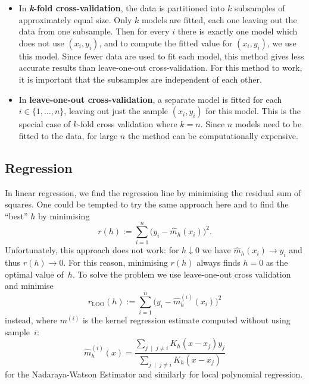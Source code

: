 \documentclass[
  a4paper,
]{article}
\theoremstyle{definition}
\theoremstyle{definition}
\theoremstyle{definition}
\theoremstyle{definition}
\theoremstyle{remark}
\begin{document}
\begin{itemize}
\item
  In \textbf{\emph{k}-fold cross-validation}, the data is partitioned into
  \(k\) subsamples of approximately equal size. Only \(k\) models are fitted,
  each one leaving out the data from one subsample. Then for every \(i\)
  there is exactly one model which does not use \((x_i, y_i)\), and
  to compute the fitted value for \((x_i, y_i)\), we use this model.
  Since fewer data are used to fit each model, this method gives less
  accurate results than leave-one-out cross-validation.
  For this method to work, it is important that the subsamples
  are independent of each other.
\item
  In \textbf{leave-one-out cross-validation}, a separate model is fitted
  for each \(i \in \{1, \ldots, n\}\), leaving out just the sample \((x_i, y_i)\)
  for this model. This is the special case of \(k\)-fold cross validation
  where \(k = n\).
  Since \(n\) models need to be fitted to the data, for large \(n\)
  the method can be computationally expensive.
\end{itemize}

\hypertarget{regression}{%
\subsection{Regression}\label{regression}}

In linear regression, we find the regression line by minimising
the residual sum of squares. One could be tempted to try the same
approach here and to find the ``best'' \(h\) by minimising
\begin{equation*}
  r(h)
  := \sum_{i=1}^n \bigl( y_i - \hat m_h(x_i) \bigr)^2.
\end{equation*}
Unfortunately, this approach does not work: for \(h \downarrow 0\)
we have \(\hat m_h(x_i) \to y_i\) and thus \(r(h) \to 0\). For this reason,
minimising \(r(h)\) always finds \(h=0\) as the optimal value of~\(h\).
To solve the problem we use leave-one-out cross validation and minimise
\begin{equation*}
  r_\mathrm{LOO}(h)
  := \sum_{i=1}^n \bigl( y_i - \hat m^{(i)}_h(x_i) \bigr)^2
\end{equation*}
instead,
where \(m^{(i)}\) is the kernel regression estimate computed without using
sample~\(i\):
\begin{equation*}
  \hat m_h^{(i)}(x)
  = \frac{\sum_{j \;\mid\; j\neq i} K_h(x - x_j)y_j}{\sum_{j \;\mid\; j\neq i}K_h(x - x_j)}
\end{equation*}
for the Nadaraya-Watson Estimator and similarly for local polynomial
regression.
\end{document}
